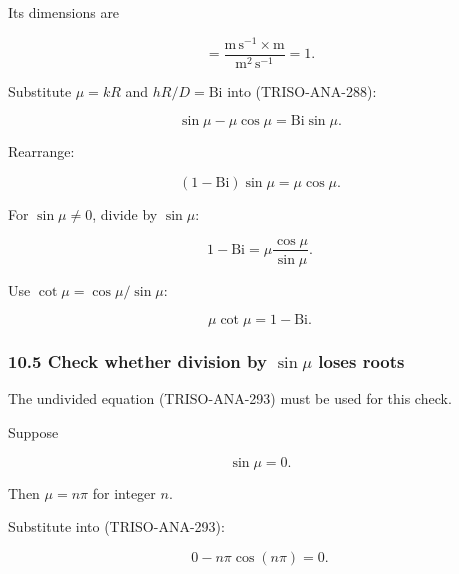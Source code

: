 \documentclass[11pt,a4paper]{article}
\begin{document}
Its dimensions are

\begin{equation}
[\mathrm{Bi}]
=
\frac{
\mathrm{m\,s^{-1}}\times\mathrm m
}{
\mathrm{m^2\,s^{-1}}
}
=
1.
\tag{TRISO-ANA-292}
\label{eq:triso-ana-292}
\end{equation}

Substitute $\mu=kR$ and $hR/D=\mathrm{Bi}$ into (TRISO-ANA-288):

\begin{equation}
\boxed{
\sin\mu-\mu\cos\mu
=
\mathrm{Bi}\sin\mu.
}
\tag{TRISO-ANA-293}
\label{eq:triso-ana-293}
\end{equation}

Rearrange:

\begin{equation}
(1-\mathrm{Bi})\sin\mu
=
\mu\cos\mu.
\tag{TRISO-ANA-294}
\label{eq:triso-ana-294}
\end{equation}

For $\sin\mu\ne0$, divide by $\sin\mu$:

\begin{equation}
1-\mathrm{Bi}
=
\mu\frac{\cos\mu}{\sin\mu}.
\tag{TRISO-ANA-295}
\label{eq:triso-ana-295}
\end{equation}

Use $\cot\mu=\cos\mu/\sin\mu$:

\begin{equation}
\boxed{
\mu\cot\mu=1-\mathrm{Bi}.
}
\tag{TRISO-ANA-296}
\label{eq:triso-ana-296}
\end{equation}

\subsubsection*{10.5 Check whether division by $\sin\mu$ loses roots}

The undivided equation (TRISO-ANA-293) must be used for this check.

Suppose

\begin{equation}
\sin\mu=0.
\tag{TRISO-ANA-297}
\label{eq:triso-ana-297}
\end{equation}

Then $\mu=n\pi$ for integer $n$.

Substitute into (TRISO-ANA-293):

\begin{equation}
0-n\pi\cos(n\pi)=0.
\tag{TRISO-ANA-298}
\label{eq:triso-ana-298}
\end{equation}
\end{document}
